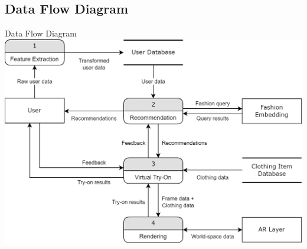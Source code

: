 \subsection{Data Flow Diagram}
\begin{frame}{Data Flow Diagram}
	\centering
	\includegraphics[width=0.85 \textwidth]{components/images/data-flow.png}
\end{frame}
